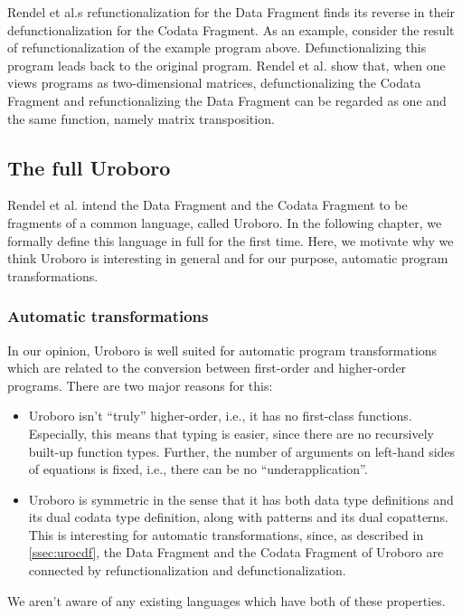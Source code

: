 Rendel et al.s refunctionalization for the Data Fragment finds its reverse in their defunctionalization for the Codata Fragment. As an example, consider the result of refunctionalization of the example program above. Defunctionalizing this program leads back to the original program. Rendel et al. show that, when one views programs as two-dimensional matrices, defunctionalizing the Codata Fragment and refunctionalizing the Data Fragment can be regarded as one and the same function, namely matrix transposition.

\subsection{The full Uroboro}
\label{ssec:urofull}

Rendel et al. intend the Data Fragment and the Codata Fragment to be fragments of a common language, called Uroboro. In the following chapter, we formally define this language in full for the first time. Here, we motivate why we think Uroboro is interesting in general and for our purpose, automatic program transformations.

\subsubsection{Automatic transformations}

In our opinion, Uroboro is well suited for automatic program transformations which are related to the conversion between first-order and higher-order programs. There are two major reasons for this:
\begin{itemize}
\item Uroboro isn't ``truly'' higher-order, i.e., it has no first-class functions. Especially, this means that typing is easier, since there are no recursively built-up function types. Further, the number of arguments on left-hand sides of equations is fixed, i.e., there can be no ``underapplication''.

\item Uroboro is symmetric in the sense that it has both data type definitions and its dual codata type definition, along with patterns and its dual copatterns. This is interesting for automatic transformations, since, as described in \autoref{ssec:urocdf}, the Data Fragment and the Codata Fragment of Uroboro are connected by refunctionalization and defunctionalization.
\end{itemize}
We aren't aware of any existing languages which have both of these properties.

